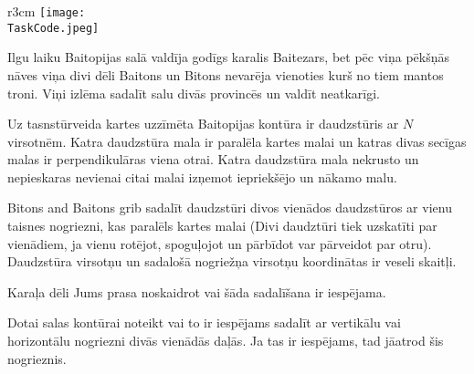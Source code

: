 \documentclass{boi2014-lv}
\renewcommand{\TaskCode}{demarcation}
\begin{document}
    \begin{wrapfigure}{r}{3cm}
        \vspace{-24pt}
		\texttt{[image: \\TaskCode.jpeg]}
	\end{wrapfigure}

		Ilgu laiku Baitopijas salā valdīja godīgs karalis Baitezars, bet pēc viņa pēkšņās nāves viņa divi dēli Baitons un Bitons nevarēja vienoties kurš no tiem mantos troni. Viņi izlēma sadalīt salu divās provincēs un valdīt neatkarīgi.
 
		Uz tasnstūrveida kartes uzzīmēta Baitopijas kontūra ir daudzstūris ar $N$ virsotnēm. Katra daudzstūra mala ir paralēla kartes malai un katras divas secīgas malas ir perpendikulāras viena otrai. %
Katra daudzstūra mala nekrusto un nepieskaras nevienai citai malai izņemot iepriekšējo un nākamo malu.

Bitons and Baitons grib sadalīt daudzstūri divos vienādos daudzstūros ar vienu taisnes nogriezni, kas paralēls kartes malai (Divi daudztūri tiek uzskatīti par vienādiem, ja vienu rotējot, spoguļojot un pārbīdot var pārveidot par otru). Daudzstūra virsotņu un sadalošā nogriežņa virsotņu koordinātas ir veseli skaitļi. 
 
		Karaļa dēli Jums prasa noskaidrot vai šāda sadalīšana ir iespējama.

    \Task
		
		Dotai salas kontūrai noteikt vai to ir iespējams sadalīt ar vertikālu vai horizontālu nogriezni divās vienādās daļās. Ja tas ir iespējams, tad jāatrod šis nogrieznis.
\end{document}
